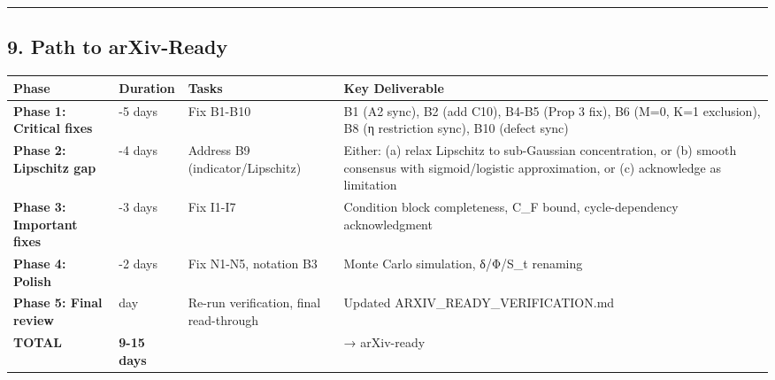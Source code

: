 \documentclass[
  12pt,
]{ctexart}
\begin{document}
\begin{center}\rule{0.5\linewidth}{0.5pt}\end{center}

\subsection{9. Path to arXiv-Ready}\label{path-to-arxiv-ready}

\begin{longtable}[]{@{}
  >{\raggedright\arraybackslash}p{}
  >{\raggedright\arraybackslash}p{}
  >{\raggedright\arraybackslash}p{}
  >{\raggedright\arraybackslash}p{}@{}}
\toprule\noalign{}
\begin{minipage}[b]{\linewidth}\raggedright
Phase
\end{minipage} & \begin{minipage}[b]{\linewidth}\raggedright
Duration
\end{minipage} & \begin{minipage}[b]{\linewidth}\raggedright
Tasks
\end{minipage} & \begin{minipage}[b]{\linewidth}\raggedright
Key Deliverable
\end{minipage} \\
\midrule\noalign{}
\endhead
\bottomrule\noalign{}
\endlastfoot
\textbf{Phase 1: Critical fixes} & 3-5 days & Fix B1-B10 & B1 (A2 sync),
B2 (add C10), B4-B5 (Prop 3 fix), B6 (M=0, K=1 exclusion), B8 (η
restriction sync), B10 (defect sync) \\
\textbf{Phase 2: Lipschitz gap} & 2-4 days & Address B9
(indicator/Lipschitz) & Either: (a) relax Lipschitz to sub-Gaussian
concentration, or (b) smooth consensus with sigmoid/logistic
approximation, or (c) acknowledge as limitation \\
\textbf{Phase 3: Important fixes} & 2-3 days & Fix I1-I7 & Condition
block completeness, C\_F bound, cycle-dependency acknowledgment \\
\textbf{Phase 4: Polish} & 1-2 days & Fix N1-N5, notation B3 & Monte
Carlo simulation, δ/Φ/S\_t renaming \\
\textbf{Phase 5: Final review} & 1 day & Re-run verification, final
read-through & Updated ARXIV\_READY\_VERIFICATION.md \\
\textbf{TOTAL} & \textbf{9-15 days} & & → arXiv-ready \\
\end{longtable}
\end{document}
